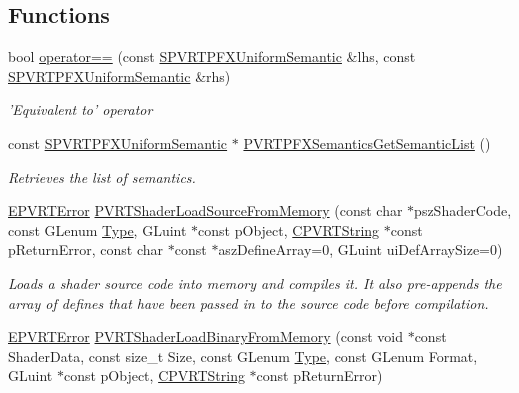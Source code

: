 \subsection*{Functions}
\begin{DoxyCompactItemize}
\item 
bool \hyperlink{group___a_p_i___o_g_l_e_s2_ga8425a5ca2f4117542f2cb1c12ded2236}{operator==} (const \hyperlink{struct_s_p_v_r_t_p_f_x_uniform_semantic}{S\+P\+V\+R\+T\+P\+F\+X\+Uniform\+Semantic} \&lhs, const \hyperlink{struct_s_p_v_r_t_p_f_x_uniform_semantic}{S\+P\+V\+R\+T\+P\+F\+X\+Uniform\+Semantic} \&rhs)
\begin{DoxyCompactList}\small\item\em 'Equivalent to' operator \end{DoxyCompactList}\item 
const \hyperlink{struct_s_p_v_r_t_p_f_x_uniform_semantic}{S\+P\+V\+R\+T\+P\+F\+X\+Uniform\+Semantic} $\ast$ \hyperlink{group___a_p_i___o_g_l_e_s2_ga47058a33ec45c4b3714e607b92a8a62e}{P\+V\+R\+T\+P\+F\+X\+Semantics\+Get\+Semantic\+List} ()
\begin{DoxyCompactList}\small\item\em Retrieves the list of semantics. \end{DoxyCompactList}\item 
\hyperlink{_p_v_r_t_error_8h_a9e837ff1a83f3a5f332bc4cc78454608}{E\+P\+V\+R\+T\+Error} \hyperlink{group___a_p_i___o_g_l_e_s2_ga01702688579886d94df09c62817fab6c}{P\+V\+R\+T\+Shader\+Load\+Source\+From\+Memory} (const char $\ast$psz\+Shader\+Code, const G\+Lenum \hyperlink{struct_type}{Type}, G\+Luint $\ast$const p\+Object, \hyperlink{class_c_p_v_r_t_string}{C\+P\+V\+R\+T\+String} $\ast$const p\+Return\+Error, const char $\ast$const $\ast$asz\+Define\+Array=0, G\+Luint ui\+Def\+Array\+Size=0)
\begin{DoxyCompactList}\small\item\em Loads a shader source code into memory and compiles it. It also pre-\/appends the array of defines that have been passed in to the source code before compilation. \end{DoxyCompactList}\item 
\hyperlink{_p_v_r_t_error_8h_a9e837ff1a83f3a5f332bc4cc78454608}{E\+P\+V\+R\+T\+Error} \hyperlink{group___a_p_i___o_g_l_e_s2_gaeae857167097428a210514c0695a3ac7}{P\+V\+R\+T\+Shader\+Load\+Binary\+From\+Memory} (const void $\ast$const Shader\+Data, const size\+\_\+t Size, const G\+Lenum \hyperlink{struct_type}{Type}, const G\+Lenum Format, G\+Luint $\ast$const p\+Object, \hyperlink{class_c_p_v_r_t_string}{C\+P\+V\+R\+T\+String} $\ast$const p\+Return\+Error)

\end{DoxyCompactItemize}
